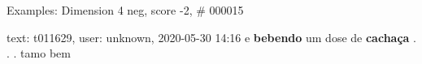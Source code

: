 \begin{frame}{Examples: Dimension 4 neg, score -2, \# 000015}
\footnotesize
\begin{alertblock}{text: t011629, user: unknown, 2020-05-30}
14:16 e \textbf{bebendo} um dose de \textbf{cachaça} . . . tamo bem 
\end{alertblock}
\end{frame}
